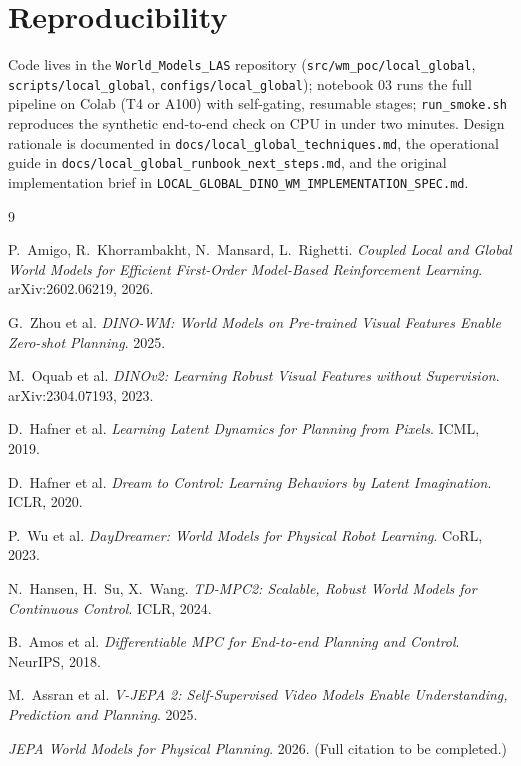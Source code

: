 \documentclass[11pt,a4paper]{article}
\begin{document}
\section*{Reproducibility}

Code lives in the \texttt{World\_Models\_LAS} repository
(\texttt{src/wm\_poc/local\_global}, \texttt{scripts/local\_global},
\texttt{configs/local\_global}); notebook 03 runs the full pipeline on Colab
(T4 or A100) with self-gating, resumable stages; \texttt{run\_smoke.sh}
reproduces the synthetic end-to-end check on CPU in under two minutes. Design
rationale is documented in \texttt{docs/local\_global\_techniques.md}, the
operational guide in \texttt{docs/local\_global\_runbook\_next\_steps.md}, and
the original implementation brief in
\texttt{LOCAL\_GLOBAL\_DINO\_WM\_IMPLEMENTATION\_SPEC.md}.

\begin{thebibliography}{9}
\setlength{\itemsep}{2pt}

P.~Amigo, R.~Khorrambakht, N.~Mansard, L.~Righetti.
\emph{Coupled Local and Global World Models for Efficient First-Order
Model-Based Reinforcement Learning}. arXiv:2602.06219, 2026.

G.~Zhou et al.
\emph{DINO-WM: World Models on Pre-trained Visual Features Enable Zero-shot
Planning}. 2025.

M.~Oquab et al.
\emph{DINOv2: Learning Robust Visual Features without Supervision}.
arXiv:2304.07193, 2023.

D.~Hafner et al.
\emph{Learning Latent Dynamics for Planning from Pixels}. ICML, 2019.

D.~Hafner et al.
\emph{Dream to Control: Learning Behaviors by Latent Imagination}. ICLR, 2020.

P.~Wu et al.
\emph{DayDreamer: World Models for Physical Robot Learning}. CoRL, 2023.

N.~Hansen, H.~Su, X.~Wang.
\emph{TD-MPC2: Scalable, Robust World Models for Continuous Control}.
ICLR, 2024.

B.~Amos et al.
\emph{Differentiable MPC for End-to-end Planning and Control}. NeurIPS, 2018.

M.~Assran et al.
\emph{V-JEPA 2: Self-Supervised Video Models Enable Understanding, Prediction
and Planning}. 2025.

\emph{JEPA World Models for Physical Planning}. 2026.
(Full citation to be completed.)

\end{thebibliography}
\end{document}
